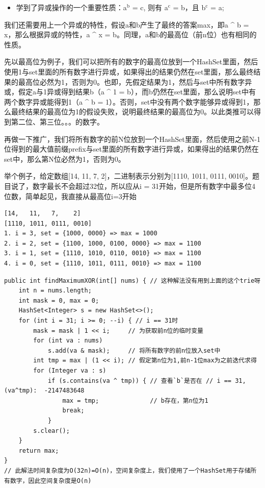 \documentclass[9pt, b5paper]{article}
\begin{document}
\begin{itemize}
\item 学到了异或操作的一个重要性质：a$^{\text{b}}$ = c, 则有 a$^{\text{c}}$ = b，且 b$^{\text{c}}$ = a;
\end{itemize}

我们还需要用上一个异或的特性，假设a和b产生了最终的答案max，即a \^{} b = x，那么根据异或的特性，a \^{} x = b。同理，a和b的最高位（前n位）也有相同的性质。

先以最高位为例子，我们可以把所有的数字的最高位放到一个HashSet里面，然后使用1与set里面的所有数字进行异或，如果得出的结果仍然在set里面，那么最终结果的最高位必然为1，否则为0。也即，先假定结果为1，然后与set中所有数字异或，假定a与1异或得到结果b（a \^{} 1 = b），而b仍然在set里面，那么说明set中有两个数字异或能得到1（a \^{} b = 1）。否则，set中没有两个数字能够异或得到1，那么最终结果的最高位为1的假设失败，说明最终结果的最高位为0。以此类推可以得到第二位、第三位。。。的数字。

再做一下推广，我们将所有数字的前N位放到一个HashSet里面，然后使用之前N-1位得到的最大值前缀prefix与set里面的所有数字进行异或，如果得出的结果仍然在set中，那么第N位必然为1，否则为0。

举个例子，给定数组[14, 11, 7, 2]，二进制表示分别为[1110, 1011, 0111, 0010]。题目说了，数字最长不会超过32位，所以应从i = 31开始，但是所有数字中最多位4位数，简单起见，我直接从最高位i=3开始
\begin{verbatim}
[14,   11,   7,    2]
[1110, 1011, 0111, 0010]
1. i = 3, set = {1000, 0000} => max = 1000
2. i = 2, set = {1100, 1000, 0100, 0000} => max = 1100
3. i = 1, set = {1110, 1010, 0110, 0010} => max = 1100
4. i = 0, set = {1110, 1011, 0111, 0010} => max = 1100
\end{verbatim}
\begin{verbatim}
public int findMaximumXOR(int[] nums) { // 这种解法没有用到上面的这个trie呀
    int n = nums.length;
    int mask = 0, max = 0;
    HashSet<Integer> s = new HashSet<>();
    for (int i = 31; i >= 0; --i) { // i == 31时
        mask = mask | 1 << i;     // 为获取前n位的临时变量     
        for (int va : nums) 
            s.add(va & mask);     // 将所有数字的前n位放入set中
        int tmp = max | (1 << i); // 假定第n位为1,前n-1位max为之前迭代求得
        for (Integer va : s) 
            if (s.contains(va ^ tmp)) { // 查看`b`是否在 // i == 31, (va^tmp):  -2147483648
                max = tmp;              // b存在，第n位为1
                break;
            }
        s.clear();
    }
    return max;
}
// 此解法时间复杂度为O(32n)=O(n)，空间复杂度上，我们使用了一个HashSet用于存储所有数字，因此空间复杂度是O(n)
\end{verbatim}
\end{document}
